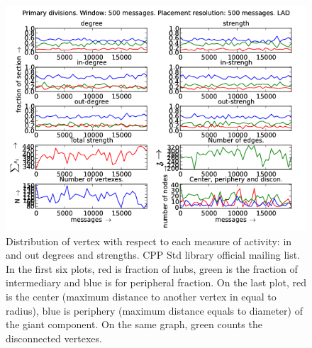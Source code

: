 \documentclass[%
 aip,
 jmp,%
 amsmath,amssymb,
 reprint,%
]{revtex4-1}
\begin{document}
\begin{figure}[hbtp] 
   \centering
        \includegraphics[width=\textwidth]{figs/LAD/500}
    \caption{Distribution of vertex with respect to each measure of activity: in and out degrees and strengths. CPP Std library official mailing list. In the first six plots, red is fraction of hubs, green is the fraction of intermediary and blue is for peripheral fraction. On the last plot, red is the center (maximum distance to another vertex in equal to radius), blue is periphery (maximum distance equals to diameter) of the giant component. On the same graph, green counts the disconnected vertexes.}
    \label{fig:lad500}
\end{figure}
\end{document}
